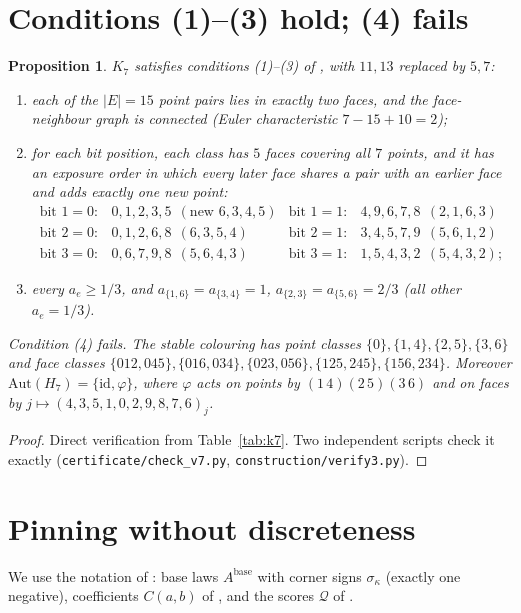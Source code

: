 \documentclass[11pt]{amsart}
\newtheorem{proposition}[theorem]{Proposition}
\theoremstyle{definition}
\theoremstyle{remark}
\newcommand{\1}{\mathbf 1}
\begin{document}
\section{Conditions (1)--(3) hold; (4) fails}
\begin{proposition}\label{prop:k7}
$K_7$ satisfies conditions (1)--(3) of \cite[Prop.~2.1]{oai}, with $11,13$ replaced by $5,7$:
\begin{enumerate}
\item each of the $|E|=15$ point pairs lies in exactly two faces, and the face-neighbour graph is connected
(Euler characteristic $7-15+10=2$);
\item for each bit position, each class has $5$ faces covering all $7$ points, and it has an exposure order in
which every later face shares a pair with an earlier face and adds exactly one new point:
\[\begin{array}{llll}
\text{bit 1}=0:&0,1,2,3,5\ \ (\text{new } 6,3,4,5)&\text{bit 1}=1:&4,9,6,7,8\ \ (2,1,6,3)\\
\text{bit 2}=0:&0,1,2,6,8\ \ (6,3,5,4)&\text{bit 2}=1:&3,4,5,7,9\ \ (5,6,1,2)\\
\text{bit 3}=0:&0,6,7,9,8\ \ (5,6,4,3)&\text{bit 3}=1:&1,5,4,3,2\ \ (5,4,3,2);
\end{array}\]
\item every $a_e\ge1/3$, and $a_{\{1,6\}}=a_{\{3,4\}}=1$, $a_{\{2,3\}}=a_{\{5,6\}}=2/3$ (all other $a_e=1/3$).
\end{enumerate}
Condition (4) fails. The stable colouring has point classes $\{0\},\{1,4\},\{2,5\},\{3,6\}$ and face classes
$\{012,045\},\{016,034\},\{023,056\},\{125,245\},\{156,234\}$. Moreover $\mathrm{Aut}(H_7)=\{\mathrm{id},\varphi\}$, where
$\varphi$ acts on points by $(1\,4)(2\,5)(3\,6)$ and on faces by $j\mapsto(4,3,5,1,0,2,9,8,7,6)_j$.
\end{proposition}
\begin{proof}
Direct verification from Table~\ref{tab:k7}. Two independent scripts check it exactly
(\texttt{certificate/check\_v7.py}, \texttt{construction/verify3.py}).
\end{proof}

\section{Pinning without discreteness}\label{sec:pinning}
We use the notation of \cite[Section~3]{oai}: base laws $A^{\mathrm{base}}$ with corner signs
$\sigma_\kappa$ (exactly one negative), coefficients $C(a,b)$ of \cite[(3.9)]{oai}, and the scores $\mathcal Q$
of \cite[Lemma~3.4]{oai}.
\end{document}
